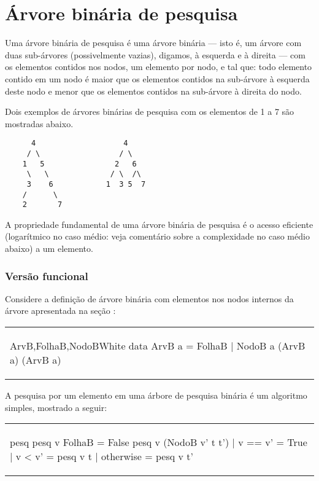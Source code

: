 \section{Árvore binária de pesquisa}
\label{sec:arvore-binaria-de-pesquisa}

Uma árvore binária de pesquisa é uma árvore binária --- isto é, um
árvore com duas sub-árvores (possivelmente vazias), digamos, à
esquerda e à direita --- com os elementos contidos nos nodos, um
elemento por nodo, e tal que: todo elemento contido em um nodo é maior
que os elementos contidos na sub-árvore à esquerda deste nodo e menor
que os elementos contidos na sub-árvore à direita do nodo.

Dois exemplos de árvores binárias de pesquisa com os elementos de 1 a
7 são mostradas abaixo. 

\begin{verbatim}
      4                    4
     / \                  / \
    1   5                2   6
     \   \              / \  /\
     3    6            1  3 5  7 
    /      \ 
    2       7
\end{verbatim}

A propriedade fundamental de uma árvore binária de pesquisa é o acesso
eficiente (logarítmico no caso médio: veja comentário sobre a
complexidade no caso médio abaixo) a um elemento.

\subsubsection{Versão funcional}

Considere a definição de árvore binária com elementos nos nodos
internos da árvore apresentada na seção :

\begin{center}
\begin{tabular}{l}
\begin{hask}{ArvB,FolhaB,NodoB}{White}
 data ArvB a = FolhaB | NodoB a (ArvB a) (ArvB a)
\end{hask}
\end{tabular}
\end{center}

A pesquisa por um elemento em uma árbore de pesquisa binária é um
algoritmo simples, mostrado a seguir:

\begin{center}
\begin{tabular}{l}
\begin{hask}{pesq}{\decremento}
pesq v FolhaB = False
pesq v (NodoB v' t t') 
  | v == v'    = True
  | v <  v'    = pesq v t
  | otherwise  = pesq v t'
\end{hask}
\end{tabular}
\end{center}

